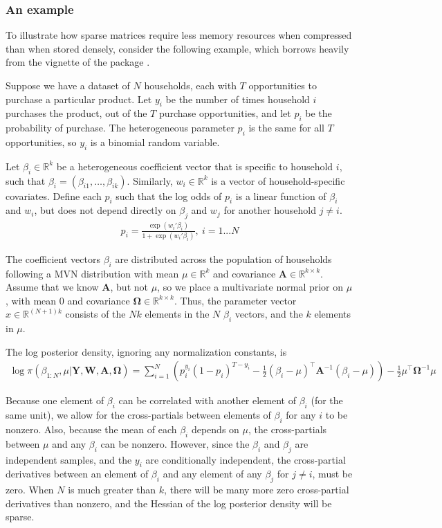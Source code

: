 \documentclass[codesnippet,nojss]{jss}\usepackage[]{graphicx}\usepackage[]{color}
\newcommand{\Real}[1]{\mathbb{R}^{#1}}
\newcommand{\Mat}[1]{\mathbf{#1}}
\begin{document}
\subsubsection{An example}

To illustrate how sparse matrices require less memory resources when
compressed than when stored densely, consider the following example,
which borrows heavily from the vignette of the
 package \citep{R_sparseHessianFD}.

Suppose we have a dataset of $N$ households, each with $T$
 opportunities to purchase a particular product.  Let $y_i$ be the
 number of times household $i$ purchases the product, out of the $T$
 purchase opportunities, and let $p_i$ be the probability of
 purchase.  The heterogeneous parameter $p_i$ is the same for all $T$
 opportunities, so $y_i$ is a binomial random variable.

 Let $\beta_i\in\Real{k}$ be a heterogeneous coefficient vector that
 is specific to household $i$, such that
 $\beta_i=(\beta_{i1},\dotsc,\beta_{ik})$. Similarly,
 $w_i\in\Real{k}$ is a vector of household-specific covariates. Define each
 $p_i$ such that the log odds of $p_i$ is a linear function of
 $\beta_i$ and $w_i$, but does not depend directly on $\beta_j$ and $w_j$ for
 another household $j\neq i$.
\begin{align}
  p_i=\frac{\exp(w_i'\beta_i)}{1+\exp(w_i'\beta_i)},~i=1 ... N
\end{align}

The coefficient vectors $\beta_i$ are distributed across the population of households
following a MVN distribution with mean $\mu\in\Real{k}$ and
covariance $\Mat{A}\in\Real{k\times k}$.   Assume that we know
$\Mat{A}$, but not $\mu$, so we place a multivariate normal prior
on $\mu$, with mean $0$ and
covariance $\Mat{\Omega}\in\Real{k\times k}$.  Thus, the parameter
vector $x\in\Real{(N+1)k}$ consists of the $Nk$ elements in the $N$ $\beta_i$ vectors,
and the $k$ elements in $\mu$.

The log posterior density, ignoring any normalization constants, is
\begin{align}
  \label{eq:LPD}
  \log \pi(\beta_{1:N},\mu|\Mat{Y}, \Mat{W}, \Mat{A},\Mat{\Omega})=\sum_{i=1}^N\left(p_i^{y_i}(1-p_i)^{T-y_i}
  -\frac{1}{2}\left(\beta_i-\mu\right)^\top\Mat{A}^{-1}\left(\beta_i-\mu\right)\right)
-\frac{1}{2}\mu^\top\Mat{\Omega}^{-1}\mu
\end{align}

Because one element of $\beta_i$ can be correlated with another
element of $\beta_i$ (for the same unit), we allow for the
cross-partials between elements of $\beta_i$ for any $i$ to be
nonzero.  Also, because the mean of each $\beta_i$ depends on $\mu$,
the cross-partials between $\mu$ and any $\beta_i$ can be nonzero.
However, since the $\beta_i$ and $\beta_j$ are independent samples,
and the $y_i$ are
conditionally independent, the cross-partial derivatives between an
element of $\beta_i$ and any element of any $\beta_j$ for $j\neq i$,
must be zero.  When $N$ is much greater than $k$, there will be many
more zero cross-partial derivatives than nonzero, and the Hessian of
the log posterior density will be sparse.
\end{document}
